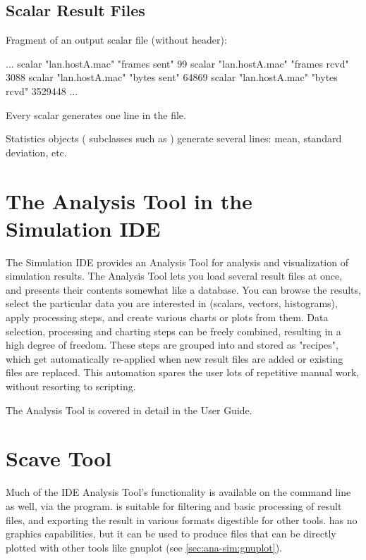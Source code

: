 \subsection{Scalar Result Files}

Fragment of an output scalar file (without header):

\begin{filelisting}
...
scalar "lan.hostA.mac" "frames sent"  99
scalar "lan.hostA.mac" "frames rcvd"  3088
scalar "lan.hostA.mac" "bytes sent"   64869
scalar "lan.hostA.mac" "bytes rcvd"   3529448
...
\end{filelisting}

Every scalar generates one  line in the file.

Statistics objects ( subclasses such as )
generate several lines: mean, standard deviation, etc.


\section{The Analysis Tool in the Simulation IDE}

The Simulation IDE provides an Analysis Tool for analysis and visualization
of simulation results. The Analysis Tool lets you load several result files
at once, and presents their contents somewhat like a database. You can
browse the results, select the particular data you are interested in
(scalars, vectors, histograms), apply processing steps, and create various
charts or plots from them. Data selection, processing and charting steps
can be freely combined, resulting in a high degree of freedom.
These steps are grouped into and stored as "recipes", which get automatically
re-applied when new result files are added or existing files are
replaced. This automation spares the user lots of repetitive manual work,
without resorting to scripting.

The Analysis Tool is covered in detail in the User Guide.


\section{Scave Tool}
\label{sec:ana-sim:scavetool}

Much of the IDE Analysis Tool's functionality is available on the command
line as well, via the  program.  is
suitable for filtering and basic processing of result files, and
exporting the result in various formats digestible for other tools.
 has no graphics capabilities, but it can be used
to produce files that can be directly plotted with other tools like
gnuplot (see \ref{sec:ana-sim:gnuplot}).

